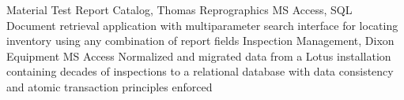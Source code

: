 %
%
%
%
%
\justifiedsubsection%
{Material Test Report Catalog, Thomas Reprographics}
{MS Access, SQL}
\workitemsOne%
{%
Document retrieval application with multiparameter search interface for locating inventory using any combination of report fields
}%
%
%
%
%
\justifiedsubsection%
{Inspection Management, Dixon Equipment}
{MS Access}
\workitemsOne%
{%
Normalized and migrated data from a Lotus installation containing decades of inspections to a relational database with data consistency and atomic transaction principles enforced
}%
%
%
%
%
%